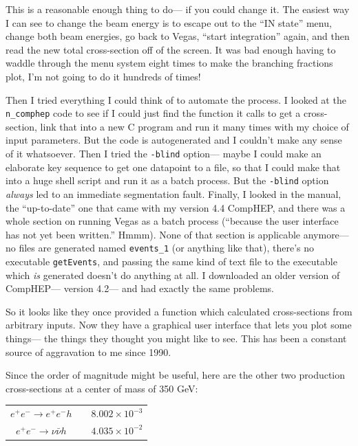 \documentclass{article}
\begin{document}
This is a reasonable enough thing to do--- if you could change it.
The easiest way I can see to change the beam energy is to escape out
to the ``IN state'' menu, change both beam energies, go back to Vegas,
``start integration'' again, and then read the new total cross-section
off of the screen.  It was bad enough having to waddle through the
menu system eight times to make the branching fractions plot, I'm not
going to do it hundreds of times!

Then I tried everything I could think of to automate the process.  I
looked at the {\tt n\_comphep} code to see if I could just find the
function it calls to get a cross-section, link that into a new C
program and run it many times with my choice of input parameters.  But
the code is autogenerated and I couldn't make any sense of it
whatsoever.  Then I tried the {\tt -blind} option--- maybe I could
make an elaborate key sequence to get one datapoint to a file, so that
I could make that into a huge shell script and run it as a batch
process.  But the {\tt -blind} option {\it always} led to an immediate
segmentation fault.  Finally, I looked in the manual, the
``up-to-date'' one that came with my version 4.4 CompHEP, and there
was a whole section on running Vegas as a batch process (``because the
user interface has not yet been written.''  Hmmm).  None of that
section is applicable anymore--- no files are generated named
{\tt events\_1} (or anything like that), there's no executable
{\tt getEvents}, and passing the same kind of text file to the
executable which {\it is} generated doesn't do anything at all.  I
downloaded an older version of CompHEP--- version 4.2--- and had
exactly the same problems.

So it looks like they once provided a function which calculated
cross-sections from arbitrary inputs.  Now they have a graphical user
interface that lets you plot some things--- the things they thought
you might like to see.  This has been a constant source of aggravation
to me since 1990.

Since the order of magnitude might be useful, here are the other two
production cross-sections at a center of mass of 350 GeV:
\begin{center}
  \begin{tabular}{c p{2 cm} c}
    $e^+e^- \to e^+e^-h$ & & $8.002 \times 10^{-3}$ \\
    $e^+e^- \to \nu\bar{\nu}h$ & & $4.035 \times 10^{-2}$
  \end{tabular}
\end{center}
\end{document}

